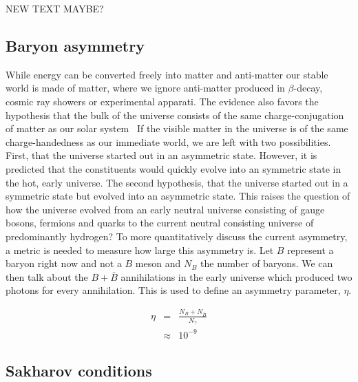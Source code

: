 NEW TEXT MAYBE?


\subsection{Baryon asymmetry}

While energy can be converted freely into matter and anti-matter our stable world is made of
matter, where we ignore anti-matter produced in $\beta$-decay, cosmic ray showers or experimental
apparati. The evidence also favors the hypothesis that the bulk of the universe consists of
the same charge-conjugation of matter as our solar system~\cite{Coppi:2004za,Steigman:1976ev}
If the visible matter in the universe is of the same charge-handedness as our immediate world,
we are left with two possibilities. First, that the universe started out in an asymmetric state.
However, it is predicted that the constituents would quickly evolve into an symmetric state
in the hot, early universe.
The second hypothesis, that the universe started out in a symmetric state but evolved into an
asymmetric state. This raises the question of how the universe evolved from an early neutral
universe consisting of gauge bosons, fermions and quarks to the current neutral consisting
universe of predominantly hydrogen? To more quantitatively discuss the current asymmetry,
a metric is needed to measure how large this asymmetry is. Let $B$ represent 
a baryon right now and not a $B$ meson and $N_B$ the number of baryons. 
We can then talk about the $B + \bar{B}$ annihilations in
the early universe which produced two photons for every annihilation. This is used to define
an asymmetry parameter, $\eta$.

\begin{eqnarray*}
    \eta &=& \frac{N_B + N_{\bar{B}}}{N_\gamma} \\
         &\approx& 10^{-9}
\end{eqnarray*}
 


\subsection{Sakharov conditions}

